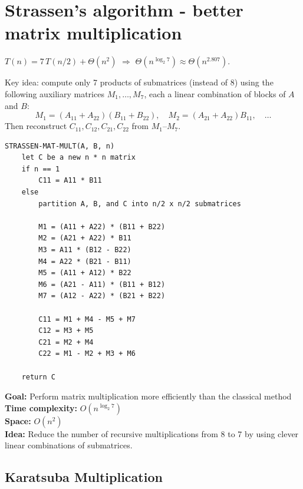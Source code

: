 \documentclass[11pt,a4paper,openany]{book}
\begin{document}
\section{Strassen's algorithm - better matrix multiplication}
\begin{propbox}[title=Complexity]
$T(n) = 7\,T(n/2) + \Theta(n^2)$ $\Rightarrow$ $\Theta(n^{\log_2 7}) \approx \Theta(n^{2.807})$.
\end{propbox}

Key idea: compute only 7 products of submatrices (instead of 8) using the following
auxiliary matrices $M_1, \ldots, M_7$, each a linear combination of blocks of $A$ and $B$:
\[
  M_1 = (A_{11}+A_{22})(B_{11}+B_{22}), \quad
  M_2 = (A_{21}+A_{22})B_{11}, \quad \ldots
\]
Then reconstruct $C_{11}, C_{12}, C_{21}, C_{22}$ from $M_1$--$M_7$.



\begin{lstlisting}
STRASSEN-MAT-MULT(A, B, n)
    let C be a new n * n matrix
    if n == 1
        C11 = A11 * B11
    else
        partition A, B, and C into n/2 x n/2 submatrices

        M1 = (A11 + A22) * (B11 + B22)
        M2 = (A21 + A22) * B11
        M3 = A11 * (B12 - B22)
        M4 = A22 * (B21 - B11)
        M5 = (A11 + A12) * B22
        M6 = (A21 - A11) * (B11 + B12)
        M7 = (A12 - A22) * (B21 + B22)

        C11 = M1 + M4 - M5 + M7
        C12 = M3 + M5
        C21 = M2 + M4
        C22 = M1 - M2 + M3 + M6

    return C
\end{lstlisting}

\textbf{Goal:} Perform matrix multiplication more efficiently than the classical method \\
\textbf{Time complexity:} $O(n^{\log_2 7})$ \\
\textbf{Space:} $O(n^2)$ \\
\textbf{Idea:} Reduce the number of recursive multiplications from 8 to 7 by using clever linear combinations of submatrices.






\vspace{2cm}






\subsection{Karatsuba Multiplication}
\end{document}
